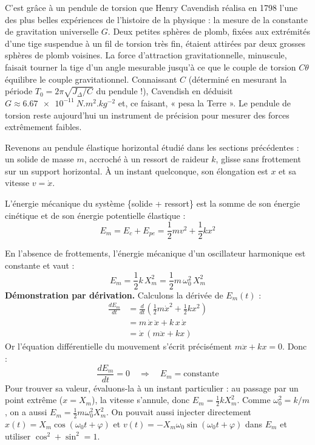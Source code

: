 \documentclass[11pt]{article}
\newcommand{\cle}[1]{{\popxbold\color{popdark}#1}}
\newcounter{popsec}
\newcounter{popsub}
\newcommand{\courssub}[1]{%
  \stepcounter{popsub}%
  \par\vspace{9pt}\noindent{\popxbold\fontsize{11.5}{13}\selectfont\color{popink}{\color{poporange}\thepopsec.\thepopsub}\hspace{6pt}#1}\par\nopagebreak\vspace{4pt}
}
\begin{document}
\begin{savaistu}
C'est grâce à un pendule de torsion que Henry Cavendish réalisa en 1798 l'une des plus belles expériences de l'histoire de la physique : la mesure de la constante de gravitation universelle $G$. Deux petites sphères de plomb, fixées aux extrémités d'une tige suspendue à un fil de torsion très fin, étaient attirées par deux grosses sphères de plomb voisines. La force d'attraction gravitationnelle, minuscule, faisait tourner la tige d'un angle mesurable jusqu'à ce que le couple de torsion $C\theta$ équilibre le couple gravitationnel. Connaissant $C$ (déterminé en mesurant la période $T_0 = 2\pi\sqrt{J_\Delta/C}$ du pendule !), Cavendish en déduisit $G \approx \SI{6,67e-11}{N.m^2.kg^{-2}}$ et, ce faisant, « pesa la Terre ». Le pendule de torsion reste aujourd'hui un instrument de précision pour mesurer des forces extrêmement faibles.
\end{savaistu}

\courssub{Énergie mécanique du pendule élastique}

Revenons au pendule élastique horizontal étudié dans les sections précédentes : un solide de masse $m$, accroché à un ressort de raideur $k$, glisse sans frottement sur un support horizontal. À un instant quelconque, son élongation est $x$ et sa vitesse $v = \dot{x}$.

\begin{definition}
L'\cle{énergie mécanique} du système \{solide + ressort\} est la somme de son énergie cinétique et de son énergie potentielle élastique :
\[ E_m = E_c + E_{pe} = \frac{1}{2}m v^2 + \frac{1}{2}k x^2 \]
\end{definition}

\begin{propriete}
En l'absence de frottements, l'énergie mécanique d'un oscillateur harmonique est \cle{constante} et vaut :
\[ E_m = \frac{1}{2}k\,X_m^2 = \frac{1}{2}m\,\omega_0^2\,X_m^2 \]
\textbf{Démonstration par dérivation.} Calculons la dérivée de $E_m(t)$ :
\begin{align*}
\frac{dE_m}{dt} &= \frac{d}{dt}\left(\frac{1}{2}m\dot{x}^2 + \frac{1}{2}k x^2\right) \\
&= m\,\dot{x}\,\ddot{x} + k\,x\,\dot{x} \\
&= \dot{x}\,\left(m\ddot{x} + kx\right)
\end{align*}
Or l'équation différentielle du mouvement s'écrit précisément $m\ddot{x} + kx = 0$. Donc :
\[ \frac{dE_m}{dt} = 0 \quad\Longrightarrow\quad E_m = \text{constante} \]
Pour trouver sa valeur, évaluons-la à un instant particulier : au passage par un point extrême ($x = X_m$), la vitesse s'annule, donc $E_m = \tfrac{1}{2}kX_m^2$. Comme $\omega_0^2 = k/m$, on a aussi $E_m = \tfrac{1}{2}m\omega_0^2 X_m^2$. On pouvait aussi injecter directement $x(t) = X_m\cos(\omega_0 t + \varphi)$ et $v(t) = -X_m\omega_0\sin(\omega_0 t + \varphi)$ dans $E_m$ et utiliser $\cos^2 + \sin^2 = 1$.
\end{propriete}
\end{document}
